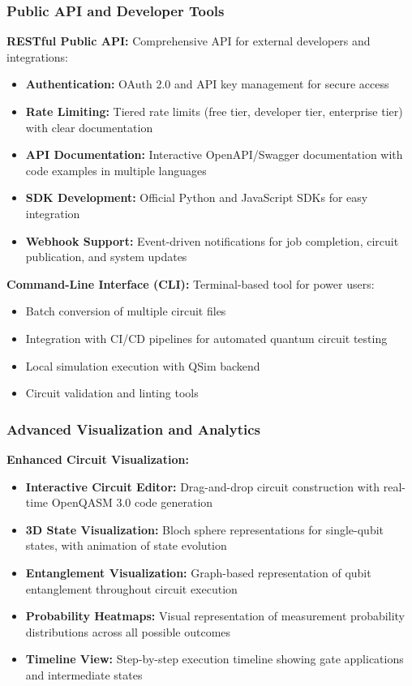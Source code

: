 \subsubsection{Public API and Developer Tools}

\textbf{RESTful Public API:} Comprehensive API for external developers and integrations:
\begin{itemize}
    \item \textbf{Authentication:} OAuth 2.0 and API key management for secure access
    \item \textbf{Rate Limiting:} Tiered rate limits (free tier, developer tier, enterprise tier) with clear documentation
    \item \textbf{API Documentation:} Interactive OpenAPI/Swagger documentation with code examples in multiple languages
    \item \textbf{SDK Development:} Official Python and JavaScript SDKs for easy integration
    \item \textbf{Webhook Support:} Event-driven notifications for job completion, circuit publication, and system updates
\end{itemize}

\textbf{Command-Line Interface (CLI):} Terminal-based tool for power users:
\begin{itemize}
    \item Batch conversion of multiple circuit files
    \item Integration with CI/CD pipelines for automated quantum circuit testing
    \item Local simulation execution with QSim backend
    \item Circuit validation and linting tools
\end{itemize}

\subsubsection{Advanced Visualization and Analytics}

\textbf{Enhanced Circuit Visualization:}
\begin{itemize}
    \item \textbf{Interactive Circuit Editor:} Drag-and-drop circuit construction with real-time OpenQASM 3.0 code generation
    \item \textbf{3D State Visualization:} Bloch sphere representations for single-qubit states, with animation of state evolution
    \item \textbf{Entanglement Visualization:} Graph-based representation of qubit entanglement throughout circuit execution
    \item \textbf{Probability Heatmaps:} Visual representation of measurement probability distributions across all possible outcomes
    \item \textbf{Timeline View:} Step-by-step execution timeline showing gate applications and intermediate states
\end{itemize}

